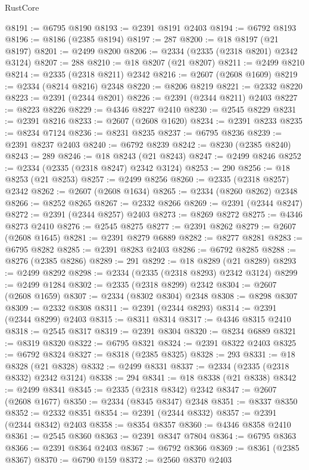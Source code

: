 \begin{lexlean}{RustCore}
\begin{coremodule}
@8191 := @6795 @8190
@8193 := @2391 @8191 @2403
@8194 := @6792 @8193
@8196 := @8186 (@2385 @8194)
@8197 := 287
@8200 := @18 @8197 (@21 @8197)
@8201 := @2499 @8200
@8206 := @2334 (@2335 (@2318 @8201) @2342 @3124)
@8207 := 288
@8210 := @18 @8207 (@21 @8207)
@8211 := @2499 @8210
@8214 := @2335 (@2318 @8211) @2342
@8216 := @2607 (@2608 @1609)
@8219 := @2334 (@8214 @8216) @2348
@8220 := @8206 @8219
@8221 := @2332 @8220
@8223 := @2391 (@2344 @8201)
@8226 := @2391 (@2344 @8211) @2403
@8227 := @8223 @8226
@8229 := @4346 @8227 @2410
@8230 := @2545 @8229
@8231 := @2391 @8216
@8233 := @2607 (@2608 @1620)
@8234 := @2391 @8233
@8235 := @8234 @7124
@8236 := @8231 @8235
@8237 := @6795 @8236
@8239 := @2391 @8237 @2403
@8240 := @6792 @8239
@8242 := @8230 (@2385 @8240)
@8243 := 289
@8246 := @18 @8243 (@21 @8243)
@8247 := @2499 @8246
@8252 := @2334 (@2335 (@2318 @8247) @2342 @3124)
@8253 := 290
@8256 := @18 @8253 (@21 @8253)
@8257 := @2499 @8256
@8260 := @2335 (@2318 @8257) @2342
@8262 := @2607 (@2608 @1634)
@8265 := @2334 (@8260 @8262) @2348
@8266 := @8252 @8265
@8267 := @2332 @8266
@8269 := @2391 (@2344 @8247)
@8272 := @2391 (@2344 @8257) @2403
@8273 := @8269 @8272
@8275 := @4346 @8273 @2410
@8276 := @2545 @8275
@8277 := @2391 @8262
@8279 := @2607 (@2608 @1645)
@8281 := @2391 @8279 @6889
@8282 := @8277 @8281
@8283 := @6795 @8282
@8285 := @2391 @8283 @2403
@8286 := @6792 @8285
@8288 := @8276 (@2385 @8286)
@8289 := 291
@8292 := @18 @8289 (@21 @8289)
@8293 := @2499 @8292
@8298 := @2334 (@2335 (@2318 @8293) @2342 @3124)
@8299 := @2499 @1284
@8302 := @2335 (@2318 @8299) @2342
@8304 := @2607 (@2608 @1659)
@8307 := @2334 (@8302 @8304) @2348
@8308 := @8298 @8307
@8309 := @2332 @8308
@8311 := @2391 (@2344 @8293)
@8314 := @2391 (@2344 @8299) @2403
@8315 := @8311 @8314
@8317 := @4346 @8315 @2410
@8318 := @2545 @8317
@8319 := @2391 @8304
@8320 := @8234 @6889
@8321 := @8319 @8320
@8322 := @6795 @8321
@8324 := @2391 @8322 @2403
@8325 := @6792 @8324
@8327 := @8318 (@2385 @8325)
@8328 := 293
@8331 := @18 @8328 (@21 @8328)
@8332 := @2499 @8331
@8337 := @2334 (@2335 (@2318 @8332) @2342 @3124)
@8338 := 294
@8341 := @18 @8338 (@21 @8338)
@8342 := @2499 @8341
@8345 := @2335 (@2318 @8342) @2342
@8347 := @2607 (@2608 @1677)
@8350 := @2334 (@8345 @8347) @2348
@8351 := @8337 @8350
@8352 := @2332 @8351
@8354 := @2391 (@2344 @8332)
@8357 := @2391 (@2344 @8342) @2403
@8358 := @8354 @8357
@8360 := @4346 @8358 @2410
@8361 := @2545 @8360
@8363 := @2391 @8347 @7804
@8364 := @6795 @8363
@8366 := @2391 @8364 @2403
@8367 := @6792 @8366
@8369 := @8361 (@2385 @8367)
@8370 := @6790 @159
@8372 := @2560 @8370 @2403

\end{coremodule}
\end{lexlean}
